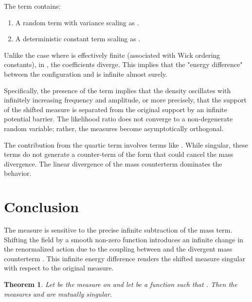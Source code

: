 \documentclass[12pt]{article}
\newtheorem{theorem}{Theorem}
\begin{document}
The term  contains:
\begin{enumerate}
\item A random term  with variance scaling as .
\item A deterministic constant term  scaling as .
\end{enumerate}
Unlike the  case where  is effectively finite (associated with Wick ordering constants), in , the coefficients diverge. This implies that the "energy difference" between the configuration  and  is infinite almost surely.

Specifically, the presence of the term  implies that the density oscillates with infinitely increasing frequency and amplitude, or more precisely, that the support of the shifted measure is separated from the original support by an infinite potential barrier. The likelihood ratio does not converge to a non-degenerate random variable; rather, the measures become asymptotically orthogonal.

The contribution from the quartic term  involves terms like . While singular, these terms do not generate a counter-term of the form  that could cancel the mass divergence. The linear divergence of the mass counterterm dominates the behavior.

\section{Conclusion}

The  measure  is sensitive to the precise infinite subtraction of the mass term. Shifting the field by a smooth non-zero function  introduces an infinite change in the renormalized action due to the coupling between  and the divergent mass counterterm . This infinite energy difference renders the shifted measure singular with respect to the original measure.

\begin{theorem}
Let  be the  measure on  and let  be a function such that . Then the measures  and  are mutually singular.
\end{theorem}
\end{document}
